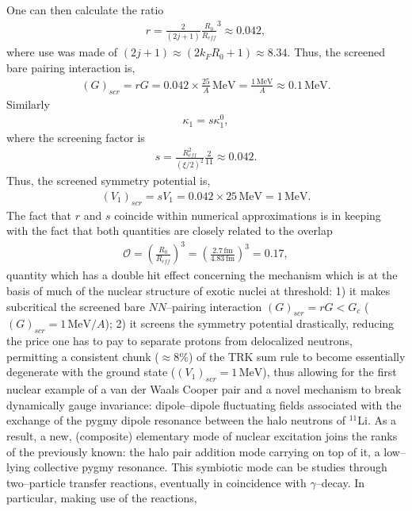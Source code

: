 \begin{subappendices}
 
  One can then calculate the ratio
    \begin{align*}
r=\frac{2}{(2j+1)}\frac{R_0}{R_{eff}}^3\approx 0.042,
   \end{align*}
 where use was made of $(2j+1)\approx (2k_FR_0+1)\approx 8.34$. Thus, the screened bare pairing interaction is,
\begin{align*}
(G)_{scr}=rG=0.042\times\frac{25}{A}\, \text{MeV}=\frac{1\,\text{MeV}}{A}\approx 0.1\,\text{MeV}.
\end{align*}
 Similarly
 \begin{align*}
\kappa_1=s\kappa_1^0,
 \end{align*}
 where the screening factor is 
  \begin{align*}
s=\frac{R_{eff}^2}{\left(\xi/2\right)^2}\frac{2}{11}\approx 0.042.
  \end{align*}
Thus, the screened symmetry potential is,
  \begin{align*}
(V_1)_{scr}=sV_1=0.042\times 25\, \text{MeV}=1\,\text{MeV}.
  \end{align*}
The fact that $r$ and $s$ coincide within numerical approximations is in keeping with the fact that both quantities are closely related to the overlap
  \begin{align*}
\mathcal{O}=\left(\frac{R_0}{R_{eff}}\right)^3=\left(\frac{2.7\,\text{fm}}{4.83\,\text{fm}}\right)^3=0.17,
  \end{align*}
quantity which has a double hit effect concerning the mechanism which is at the basis of much of the nuclear structure of exotic nuclei at threshold: 1) it makes subcritical the screened bare $NN$--pairing interaction $(G)_{scr}=rG<G_c$ ($(G)_{scr}=1\,\text{MeV}/A$); 2) it screens the symmetry potential drastically, reducing the price one has to pay to separate protons from delocalized neutrons, permitting a consistent chunk ($\approx 8$\%) of the TRK sum rule to  become essentially degenerate with the  ground state ($(V_1)_{scr}=1 \,\text{MeV}$), thus allowing for the first nuclear example of a van der Waals Cooper pair and a novel mechanism to break dynamically gauge invariance: dipole--dipole fluctuating fields associated with the exchange of the pygmy dipole resonance between the halo neutrons of $^{11}$Li. As a result, a new, (composite) elementary mode of nuclear excitation joins the ranks of the previously known: the halo pair addition mode carrying on top of it, a low--lying collective pygmy resonance. This symbiotic mode can be studies through two--particle transfer reactions, eventually in coincidence with $\gamma$--decay. In particular, making use of the reactions,\vspace{0.2cm}

\end{subappendices}
